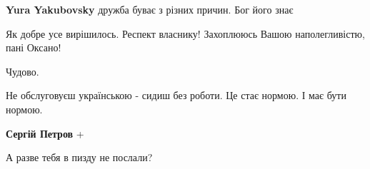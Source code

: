 \begin{itemize}
\begin{itemize}
\textbf{Yura Yakubovsky} дружба буває з різних причин. Бог його знає

\end{itemize}

 
Як добре усе вирішилось. Респект власнику!
Захоплююсь Вашою наполегливістю, пані Оксано!

 
Чудово.

 
Не обслуговуєш українською - сидиш без роботи. Це стає нормою. І має бути нормою.

\begin{itemize}
 
\textbf{Сергій Петров} +
\end{itemize}

 
А разве тебя в пизду не послали?

\begin{itemize}
 

\end{itemize}
\end{itemize}
